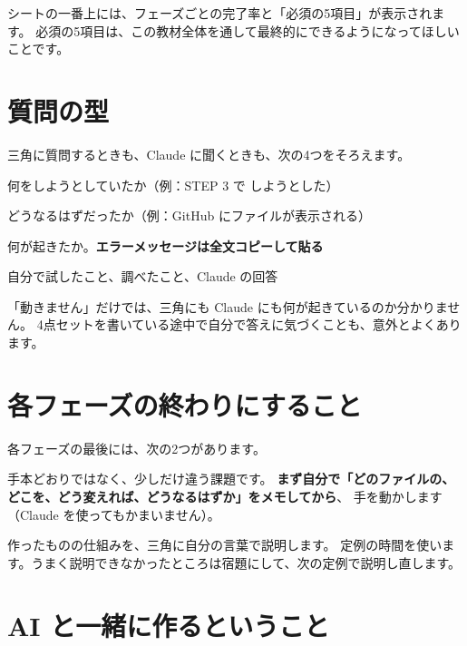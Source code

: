 シートの一番上には、フェーズごとの完了率と「必須の5項目」が表示されます。
必須の5項目は、この教材全体を通して最終的にできるようになってほしいことです。

\section{質問の型}

三角に質問するときも、Claude に聞くときも、次の4つをそろえます。

\begin{tcolorbox}[kwbase,colback=washi,colframe=kon!40,title={質問の型（4点セット）},
  colbacktitle=kon!40]
\begin{description}[font=\sffamily\bfseries,leftmargin=6em,style=nextline]
  \item[やりたいこと] 何をしようとしていたか（例：STEP 3 で  しようとした）
  \item[期待したこと] どうなるはずだったか（例：GitHub にファイルが表示される）
  \item[実際] 何が起きたか。\textbf{エラーメッセージは全文コピーして貼る}
  \item[試したこと] 自分で試したこと、調べたこと、Claude の回答
\end{description}
\end{tcolorbox}

「動きません」だけでは、三角にも Claude にも何が起きているのか分かりません。
4点セットを書いている途中で自分で答えに気づくことも、意外とよくあります。

\section{各フェーズの終わりにすること}

各フェーズの最後には、次の2つがあります。

\begin{description}[font=\sffamily\bfseries]
  \item[腕だめし] 手本どおりではなく、少しだけ違う課題です。
    \textbf{まず自分で「どのファイルの、どこを、どう変えれば、どうなるはずか」をメモしてから}、
    手を動かします（Claude を使ってもかまいません）。
  \item[説明タスク] 作ったものの仕組みを、三角に自分の言葉で説明します。
    定例の時間を使います。うまく説明できなかったところは宿題にして、次の定例で説明し直します。
\end{description}

\section{AI と一緒に作るということ}

